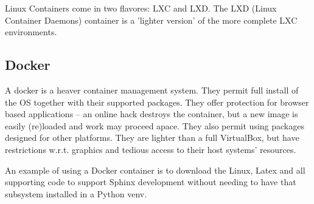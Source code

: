 Linux Containers come in two flavores: LXC and LXD. The LXD (Linux
Container Daemons) container is a 'lighter version' of the more
complete LXC environments.

\subsection{Docker}

A docker is a heaver container management system. They permit full install of
the OS together with their supported packages. They offer protection for
browser based applications -- an online hack destroys the container, but
a new image is easily (re)loaded and work may proceed apace. They also permit
using packages designed for other platforms. They are lighter than a full VirtualBox,
but have restrictions w.r.t. graphics and tedious access to their host systems' 
resources.

An example of using a Docker container is to download the Linux, Latex and
all supporting code to support Sphinx development without needing to have
that subsystem installed in a Python venv.





